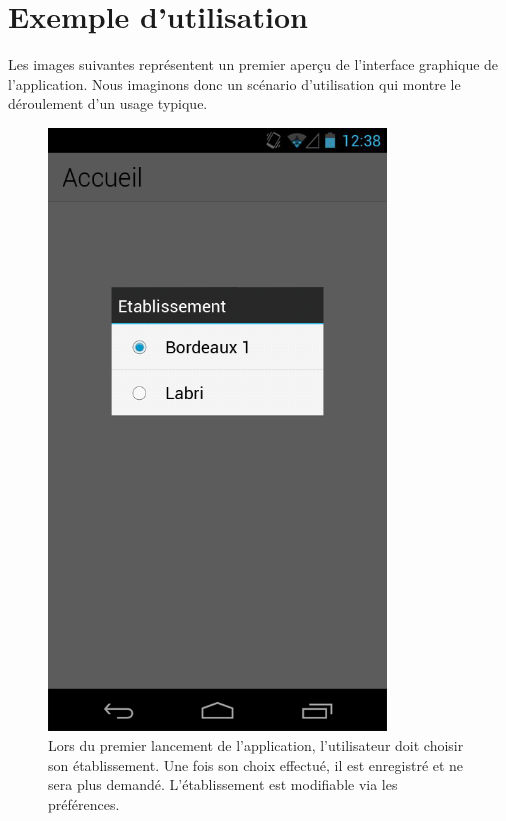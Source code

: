 \documentclass [pdftex,12pt] {report}
\begin{document}
\chapter{Exemple d'utilisation}

Les images suivantes représentent un premier aperçu de l'interface graphique de l'application. Nous imaginons donc un scénario d'utilisation qui montre le déroulement d'un usage typique. 

\begin{figure}
  \begin{minipage}[t]{8cm}
    \centering
    \includegraphics[width=0.8\textwidth]{resources/ui_preview/01}
    \caption{Lors du premier lancement de l'application, l'utilisateur doit choisir son établissement. Une fois son choix effectué, il est enregistré et ne sera plus demandé. L'établissement est modifiable via les préférences.}
    \label{fig:01}

\end{minipage}
\end{figure}
\end{document}
